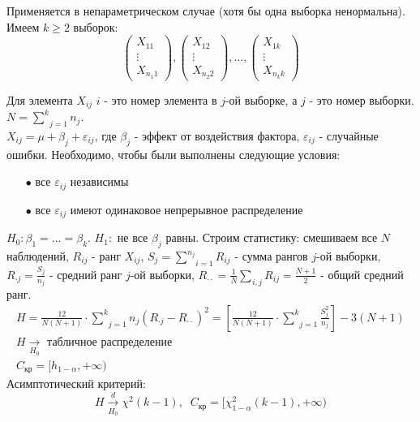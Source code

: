 		Применяется в непараметрическом случае (хотя бы одна выборка ненормальна).\\

		Имеем $k \ge 2$ выборок:
		$$\begin{pmatrix}
			X_{11} \\ \vdots \\ X_{n_1 1}
		\end{pmatrix}, \begin{pmatrix}
			X_{12} \\ \vdots \\ X_{n_2 2}
		\end{pmatrix}, \dots, \begin{pmatrix}
			X_{1k} \\ \vdots \\ X_{n_k k}
		\end{pmatrix}$$

		Для элемента $X_{ij}$ $i$ - это номер элемента в $j$-ой выборке, а $j$ - это номер выборки. $N = \underset{j=1}{\overset{k}{\sum}}n_j$.\\

		$X_{ij} = \mu + \beta_j + \varepsilon_{ij}$, где $\beta_j$ - эффект от воздействия фактора, $\varepsilon_{ij}$ - случайные ошибки. Необходимо, чтобы были выполнены следующие условия:
		\begin{itemize}
			\item[$\bullet$] все $\varepsilon_{ij}$ независимы
			\item[$\bullet$] все $\varepsilon_{ij}$ имеют одинаковое непрерывное распределение
		\end{itemize}
		$H_0: \beta_1 = \dots = \beta_k$. $H_1:$ не все $\beta_j$ равны. Строим статистику: смешиваем все $N$ наблюдений, $R_{ij}$ - ранг $X_{ij}$, $S_j = \underset{i=1}{\overset{n_j}{\sum}}R_{ij}$ - сумма рангов $j$-ой выборки, $R_{\cdot j} = \frac{S_j}{n_j}$ - средний ранг $j$-ой выборки, $R_{\cdot \cdot} = \frac{1}{N}\underset{i,j}{\overset{}{\sum}}R_{ij} = \frac{N+1}{2}$ - общий средний ранг.
		$$\begin{gathered}
			H = \frac{12}{N(N+1)}\cdot \underset{j=1}{\overset{k}{\sum}}n_j (R_{\cdot j} - R_{\cdot \cdot})^2 = \left[ \frac{12}{N (N+1)} \cdot \underset{j=1}{\overset{k}{\sum}}\frac{S_j^2}{n_j} \right] - 3 (N+1) \\
			H \xrightarrow[H_0]{} \text{ табличное распределение}\\
			C_{\text{кр}} = [h_{1-\alpha}, +\infty)
		\end{gathered}$$
		Асимптотический критерий:
		$$H \xrightarrow[H_0]{d}\chi^2 (k-1), \; \; C_{\text{кр}} = [ \chi_{1-\alpha}^2 (k-1), +\infty)$$

